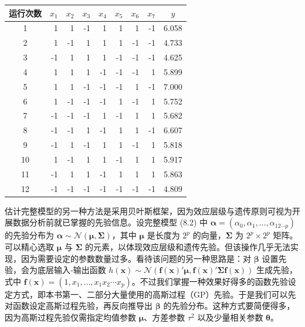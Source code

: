 \documentclass{ctexart}
\begin{document}
\begin{table}[htbp]
\begin{tabular}{c|r|r|r|r|r|r|r|c}
\hline
运行次数 & $x_1$ & $x_2$ & $x_3$ & $x_4$ & $x_5$ & $x_6$ & $x_7$ & $y$ \\
\hline
1 & 1 & 1 & -1 & 1 & 1 & 1 & -1 & 6.058 \\
2 & 1 & -1 & 1 & 1 & 1 & -1 & -1 & 4.733 \\
3 & -1 & 1 & 1 & 1 & -1 & -1 & -1 & 4.625 \\
4 & 1 & 1 & 1 & -1 & -1 & -1 & 1 & 5.899 \\
5 & 1 & 1 & -1 & -1 & -1 & 1 & -1 & 7.000 \\
6 & 1 & -1 & -1 & -1 & 1 & -1 & 1 & 5.752 \\
7 & -1 & -1 & -1 & 1 & -1 & 1 & 1 & 5.682 \\
8 & -1 & -1 & 1 & -1 & 1 & 1 & -1 & 6.607 \\
9 & -1 & 1 & -1 & 1 & 1 & -1 & 1 & 5.818 \\
10 & 1 & -1 & 1 & 1 & -1 & 1 & 1 & 5.917 \\
11 & -1 & 1 & 1 & -1 & 1 & 1 & 1 & 5.863 \\
12 & -1 & -1 & -1 & -1 & -1 & -1 & -1 & 4.809 \\
\hline
\end{tabular}
\end{table}

估计完整模型的另一种方法是采用贝叶斯框架，因为效应层级与遗传原则可视为开展数据分析前就已掌握的先验信息。设完整模型 (8.2) 中 $\boldsymbol{\alpha}=(\alpha_0,\alpha_1,\dots,\alpha_{12\cdots p})$ 的先验分布为 $\boldsymbol{\alpha}\sim\mathcal{N}(\boldsymbol{\mu},\boldsymbol{\Sigma})$，其中 $\boldsymbol{\mu}$ 是长度为 $2^p$ 的向量，$\boldsymbol{\Sigma}$ 为 $2^p\times2^p$ 矩阵。可以精心选取 $\boldsymbol{\mu}$ 与 $\boldsymbol{\Sigma}$ 的元素，以体现效应层级和遗传先验。但该操作几乎无法实现，因为需要设定的参数数量过多。看待该问题的另一种思路是：对 $\boldsymbol{\beta}$ 设置先验，会为底层输入‑输出函数 $h(\boldsymbol{x})\sim\mathcal{N}(\boldsymbol{f}(\boldsymbol{x})'\boldsymbol{\mu},\boldsymbol{f}(\boldsymbol{x})'\boldsymbol{\Sigma} \boldsymbol{f}(\boldsymbol{x}))$ 生成先验，式中 $\boldsymbol{f}(\boldsymbol{x})=(1,x_1,\dots,x_1x_2\cdots x_p)$。不过我们掌握一种效果好得多的函数先验设定方式，即本书第一、二部分大量使用的高斯过程（GP）先验。于是我们可以先对函数设定高斯过程先验，再反向推导出 $\boldsymbol{\beta}$ 的先验分布。这种方式要简便得多，因为高斯过程先验仅需指定均值参数 $\boldsymbol{\mu}$、方差参数 $\tau^2$ 以及少量相关参数 $\boldsymbol{\theta}$。
\end{document}
